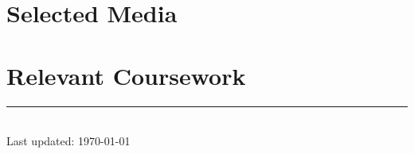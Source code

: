 \documentclass[11pt]{article}
\newcommand{\myinput}[1]{
  
}
\begin{document}
\newpage
{}
\section*{Selected Media}
\label{media}
\myinput{media}


{}
\section*{Relevant Coursework}
\label{coursework}
\myinput{coursework}

\centering
\rule{0.25\linewidth}{0.4pt}\\
\medskip
Last updated: \today
\end{document}
